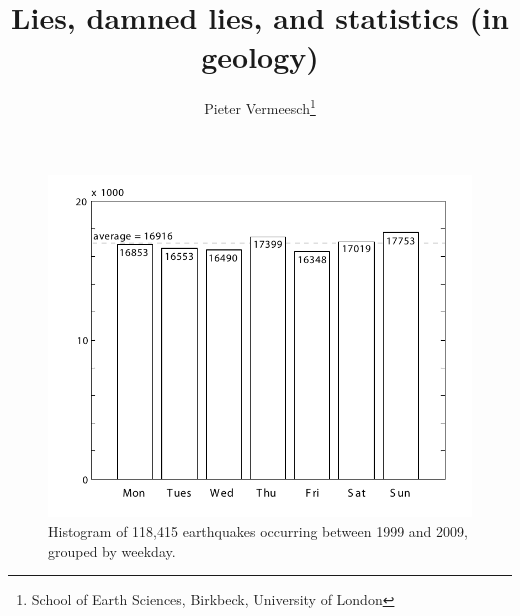 \documentclass{article}
\title{Lies, damned lies, and statistics (in geology)}
\author{Pieter Vermeesch\footnote{School of Earth Sciences,
Birkbeck, University of London}}
\date{}
\begin{document}
\setcounter{page}{3} 
\begin{figure}[h]
  \centering
\includegraphics[width=\textwidth]{histogram-1999-2009.pdf}  
  \caption{Histogram of 118,415 earthquakes occurring between 1999
    and 2009, grouped by weekday.}
  \label{fig:1}
\end{figure}
\end{document}
